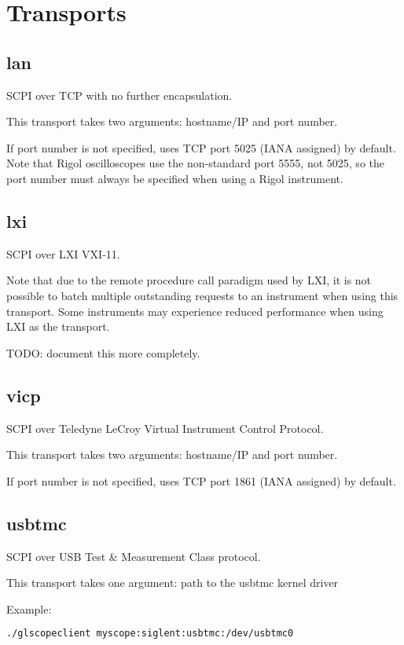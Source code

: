\section{Transports}
\label{sec:transports}

\subsection{lan}

SCPI over TCP with no further encapsulation.

This transport takes two arguments: hostname/IP and port number.

If port number is not specified, uses TCP port 5025 (IANA assigned) by default. Note that Rigol oscilloscopes use the
non-standard port 5555, not 5025, so the port number must always be specified when using a Rigol instrument.

\subsection{lxi}

SCPI over LXI VXI-11.

Note that due to the remote procedure call paradigm used by LXI, it is not possible to batch multiple outstanding
requests to an instrument when using this transport. Some instruments may experience reduced performance when using LXI
as the transport.

TODO: document this more completely.

\subsection{vicp}

SCPI over Teledyne LeCroy Virtual Instrument Control Protocol.

This transport takes two arguments: hostname/IP and port number.

If port number is not specified, uses TCP port 1861 (IANA assigned) by default.

\subsection{usbtmc}

SCPI over USB Test \& Measurement Class protocol.

This transport takes one argument: path to the usbtmc kernel driver

Example:
\begin{lstlisting}[language=sh]
./glscopeclient myscope:siglent:usbtmc:/dev/usbtmc0
\end{lstlisting}


